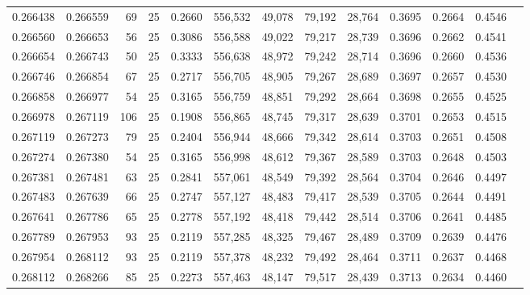 \begin{tabular}{rrrrrrrrrrrrr}
0.266438 & 0.266559 &    69 &  25 &                                     0.2660 & 556,532 &  49,078 &  79,192 &  28,764 & 0.3695 & 0.2664 & 0.4546 \\
0.266560 & 0.266653 &    56 &  25 &                                     0.3086 & 556,588 &  49,022 &  79,217 &  28,739 & 0.3696 & 0.2662 & 0.4541 \\
0.266654 & 0.266743 &    50 &  25 &                                     0.3333 & 556,638 &  48,972 &  79,242 &  28,714 & 0.3696 & 0.2660 & 0.4536 \\
0.266746 & 0.266854 &    67 &  25 &                                     0.2717 & 556,705 &  48,905 &  79,267 &  28,689 & 0.3697 & 0.2657 & 0.4530 \\
0.266858 & 0.266977 &    54 &  25 &                                     0.3165 & 556,759 &  48,851 &  79,292 &  28,664 & 0.3698 & 0.2655 & 0.4525 \\
0.266978 & 0.267119 &   106 &  25 &                                     0.1908 & 556,865 &  48,745 &  79,317 &  28,639 & 0.3701 & 0.2653 & 0.4515 \\
0.267119 & 0.267273 &    79 &  25 &                                     0.2404 & 556,944 &  48,666 &  79,342 &  28,614 & 0.3703 & 0.2651 & 0.4508 \\
0.267274 & 0.267380 &    54 &  25 &                                     0.3165 & 556,998 &  48,612 &  79,367 &  28,589 & 0.3703 & 0.2648 & 0.4503 \\
0.267381 & 0.267481 &    63 &  25 &                                     0.2841 & 557,061 &  48,549 &  79,392 &  28,564 & 0.3704 & 0.2646 & 0.4497 \\
0.267483 & 0.267639 &    66 &  25 &                                     0.2747 & 557,127 &  48,483 &  79,417 &  28,539 & 0.3705 & 0.2644 & 0.4491 \\
0.267641 & 0.267786 &    65 &  25 &                                     0.2778 & 557,192 &  48,418 &  79,442 &  28,514 & 0.3706 & 0.2641 & 0.4485 \\
0.267789 & 0.267953 &    93 &  25 &                                     0.2119 & 557,285 &  48,325 &  79,467 &  28,489 & 0.3709 & 0.2639 & 0.4476 \\
0.267954 & 0.268112 &    93 &  25 &                                     0.2119 & 557,378 &  48,232 &  79,492 &  28,464 & 0.3711 & 0.2637 & 0.4468 \\
0.268112 & 0.268266 &    85 &  25 &                                     0.2273 & 557,463 &  48,147 &  79,517 &  28,439 & 0.3713 & 0.2634 & 0.4460 \\

\end{tabular}
